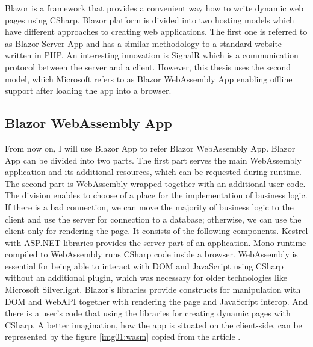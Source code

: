 Blazor is a framework that provides a convenient way how to write dynamic web pages using CSharp.
Blazor platform is divided into two hosting models \cite{13} which have different approaches to creating web applications. 
The first one is referred to as Blazor Server App and has a similar methodology to a standard website written in PHP.
An interesting innovation is SignalR which is a communication protocol between the server and a client.
However, this thesis uses the second model, which Microsoft refers to as Blazor WebAssembly App enabling offline support after loading the app into a browser.

\subsection{Blazor WebAssembly App}
From now on, I will use Blazor App to refer Blazor WebAssembly App.
Blazor App can be divided into two parts.
The first part serves the main WebAssembly application and its additional resources, which can be requested during runtime.
The second part is WebAssembly wrapped together with an additional user code.
The division enables to choose of a place for the implementation of business logic.
If there is a bad connection, we can move the majority of business logic to the client and use the server for connection to a database; otherwise, we can use the client only for rendering the page. It consists of the following components. 
Kestrel with ASP.NET libraries provides the server part of an application.
Mono runtime compiled to WebAssembly runs CSharp code inside a browser.
WebAssembly is essential for being able to interact with DOM and JavaScript using CSharp without an additional plugin, which was necessary for older technologies like Microsoft Silverlight.
Blazor's libraries provide constructs for manipulation with DOM and WebAPI together with rendering the page and JavaScript interop.
And there is a user's code that using the libraries for creating dynamic pages with CSharp.
A better imagination, how the app is situated on the client-side, can be represented by the figure \ref{img01:wasm} copied from the article \cite{15}.

